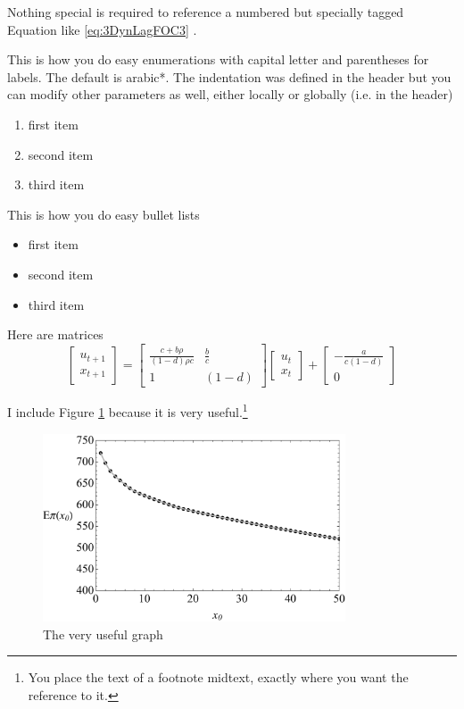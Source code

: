 \documentclass[11pt,letter]{article}
\begin{document}
Nothing special is required to reference a numbered but specially tagged Equation like  \ref{eq:3DynLagFOC3} .

This is how you do easy enumerations with capital letter and parentheses for labels. The default is arabic*. The indentation was defined in the header but you can modify other parameters as well, either locally or globally (i.e. in the header) 

\begin{enumerate}[label=(\Alph*)]\itemsep0pt \parskip0pt 
	\item first item 
	\item second item 
	\item third item
\end{enumerate}

This is how you do easy bullet lists
\begin{itemize}
	\item first item 
	\item second item 
	\item third item
\end{itemize}


Here are matrices
\begin{equation*}
 \begin{bmatrix} u_{t+1} \\ x_{t+1} \end{bmatrix} = \begin{bmatrix} {{\frac{c+ b \rho}{(1-d) \rho c}}}&{{\frac{b}{c}}} \\ 
  {{1}}&{{(1-d)}}  \end{bmatrix} \begin{bmatrix} u_t \\ x_t \end{bmatrix} + \begin{bmatrix} - \frac{a}{c(1-d)} \\ 0 \end{bmatrix} 
\end{equation*}

I include Figure \ref{fig:myfirstpic} because it is very useful.\footnote{You place the text of a footnote midtext, exactly where you want the reference to it.}

\begin{figure}[htbp]
	\centering
		\includegraphics[width=0.80\textwidth]{Pest3PeriodV0spline.pdf}
	\caption{The very useful graph}
	\label{fig:myfirstpic}
\end{figure}
\end{document}
